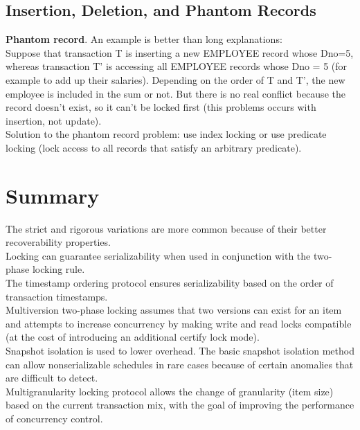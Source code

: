 \subsection{Insertion, Deletion, and Phantom Records}
\textbf{Phantom record}. An example is better than long explanations:\\
Suppose that transaction T is inserting a new EMPLOYEE record whose Dno=5, whereas transaction T' is accessing all EMPLOYEE records whose Dno = 5 (for example to add up their salaries). Depending on the order of T and T', the new employee is included in the sum or not. But there is no real conflict because the record doesn't exist, so it can't be locked first (this problems occurs with insertion, not update).\\
Solution to the phantom record problem: use index locking or use predicate locking (lock access to all records that satisfy an arbitrary predicate).

\section{Summary}
The strict and rigorous variations are more common because of their better recoverability properties.\\

Locking can guarantee serializability when used in conjunction with the two-phase locking rule.\\

The timestamp ordering protocol ensures serializability based on the order of transaction timestamps.\\

Multiversion two-phase locking assumes that two versions can exist for an item and attempts to increase concurrency by making write and read locks compatible (at the cost of introducing an additional certify lock mode).\\

Snapshot isolation is used to lower overhead. The basic snapshot isolation method can allow nonserializable schedules in rare cases because of certain anomalies that are difficult to detect.\\

Multigranularity locking protocol allows the change of granularity (item size) based on the current transaction mix, with the goal of improving the performance of concurrency control.